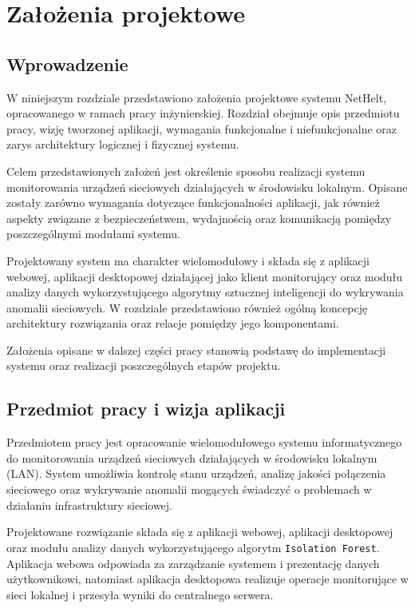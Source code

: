 \chapter{Założenia projektowe}
\label{chap:project-assumptions}

\section{Wprowadzenie}

W niniejszym rozdziale przedstawiono założenia projektowe systemu NetHelt, opracowanego w ramach pracy inżynierskiej. Rozdział obejmuje opis przedmiotu pracy, wizję tworzonej aplikacji, wymagania funkcjonalne i niefunkcjonalne oraz zarys architektury logicznej i fizycznej systemu.

Celem przedstawionych założeń jest określenie sposobu realizacji systemu monitorowania urządzeń sieciowych działających w środowisku lokalnym. Opisane zostały zarówno wymagania dotyczące funkcjonalności aplikacji, jak również aspekty związane z bezpieczeństwem, wydajnością oraz komunikacją pomiędzy poszczególnymi modułami systemu.

Projektowany system ma charakter wielomodułowy i składa się z aplikacji webowej, aplikacji desktopowej działającej jako klient monitorujący oraz modułu analizy danych wykorzystującego algorytmy sztucznej inteligencji do wykrywania anomalii sieciowych. W rozdziale przedstawiono również ogólną koncepcję architektury rozwiązania oraz relacje pomiędzy jego komponentami.

Założenia opisane w dalszej części pracy stanowią podstawę do implementacji systemu oraz realizacji poszczególnych etapów projektu.

\section{Przedmiot pracy i wizja aplikacji}

Przedmiotem pracy jest opracowanie wielomodułowego systemu informatycznego do monitorowania urządzeń sieciowych działających w środowisku lokalnym (LAN). System umożliwia kontrolę stanu urządzeń, analizę jakości połączenia sieciowego oraz wykrywanie anomalii mogących świadczyć o problemach w działaniu infrastruktury sieciowej.

Projektowane rozwiązanie składa się z aplikacji webowej, aplikacji desktopowej oraz modułu analizy danych wykorzystującego algorytm \texttt{Isolation Forest}. Aplikacja webowa odpowiada za zarządzanie systemem i prezentację danych użytkownikowi, natomiast aplikacja desktopowa realizuje operacje monitorujące w sieci lokalnej i przesyła wyniki do centralnego serwera.

